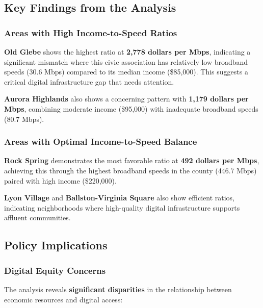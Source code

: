 \documentclass[
  letterpaper,
  DIV=11,
  numbers=noendperiod]{scrartcl}
\begin{document}
\subsection{Key Findings from the
Analysis}\label{key-findings-from-the-analysis}

\subsubsection{Areas with High Income-to-Speed
Ratios}\label{areas-with-high-income-to-speed-ratios}

\textbf{Old Glebe} shows the highest ratio at \textbf{2,778 dollars per
Mbps}, indicating a significant mismatch where this civic association
has relatively low broadband speeds (30.6 Mbps) compared to its median
income (\$85,000). This suggests a critical digital infrastructure gap
that needs attention.

\textbf{Aurora Highlands} also shows a concerning pattern with
\textbf{1,179 dollars per Mbps}, combining moderate income (\$95,000)
with inadequate broadband speeds (80.7 Mbps).

\subsubsection{Areas with Optimal Income-to-Speed
Balance}\label{areas-with-optimal-income-to-speed-balance}

\textbf{Rock Spring} demonstrates the most favorable ratio at
\textbf{492 dollars per Mbps}, achieving this through the highest
broadband speeds in the county (446.7 Mbps) paired with high income
(\$220,000).

\textbf{Lyon Village} and \textbf{Ballston-Virginia Square} also show
efficient ratios, indicating neighborhoods where high-quality digital
infrastructure supports affluent communities.

\subsection{Policy Implications}\label{policy-implications-1}

\subsubsection{Digital Equity Concerns}\label{digital-equity-concerns}

The analysis reveals \textbf{significant disparities} in the
relationship between economic resources and digital access:
\end{document}
